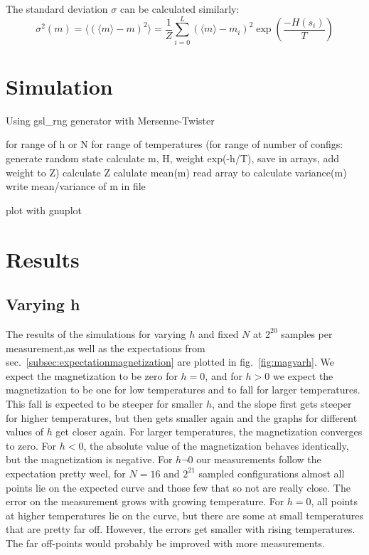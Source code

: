 \documentclass{scrartcl}
\begin{document}
The standard deviation $\sigma$ can be calculated similarly:
\[\sigma^2(m)=\langle(\langle m\rangle-m)^2\rangle=\frac{1}{Z}\sum_{i=0}^{L}(\langle m\rangle-m_i)^2\exp\left( \frac{-H(s_i)}{T}\right) \]



\section{Simulation}
Using gsl\_rng generator with Mersenne-Twister\cite{gsldoc}

for range of h or N
for range of temperatures
(for range of number of configs:
generate random state
calculate m, H, weight exp(-h/T), save in arrays, add weight to Z)
calculate Z
calulate mean(m)
read array to calculate variance(m)
write mean/variance of m in file

plot with gnuplot

\section{Results}
\label{sec:results}
\subsection{Varying h}
The results of the simulations for varying $h$ and fixed $N$ at $2^{20}$ samples per measurement,as well as the expectations from sec.~\ref{subsec:expectationmagnetization} are plotted in fig.~\ref{fig:magvarh}. We expect the magnetization to be zero for $h=0$, and for $h>0$ we expect the magnetization to be one for  low temperatures and to fall for larger temperatures. This fall is expected to be steeper for smaller $h$, and the slope first gets steeper for higher temperatures, but then gets smaller again and the graphs for different values of $h$ get closer again. For larger temperatures, the magnetization converges to zero. For $h<0$, the absolute value of the magnetization behaves identically, but the magnetization is negative. For $h\neg 0$ our measurements follow the expectation pretty weel, for $N=16$ and $2^{21}$ sampled configurations almost all points lie on the expected curve and those few that so not are really close. The error on the measurement grows with growing temperature. For $h=0$, all points at higher temperatures lie on the curve, but there are some at small temperatures that are pretty far off. However, the errors get smaller with rising temperatures. The far off-points would probably be improved with more measurements.
\end{document}
